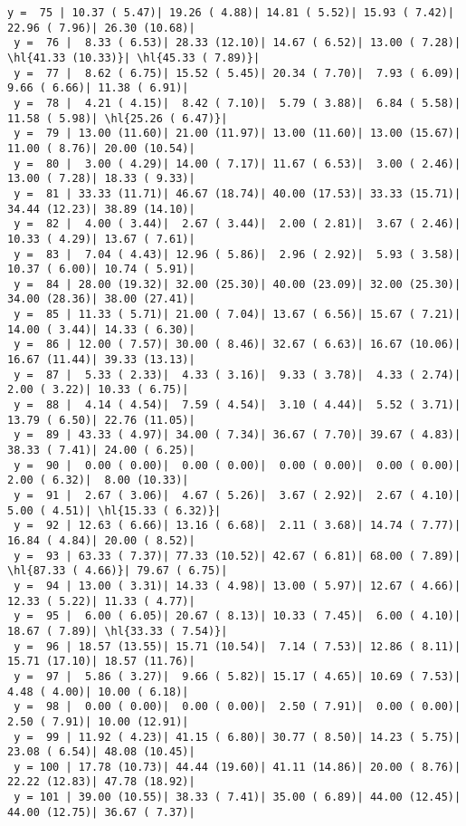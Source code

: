 \documentclass[10pt]{article}
\newcommand{\hl}[1]{\textbf{\textcolor{red}{#1}}}
\begin{document}
\begin{Verbatim}[fontsize=\small, commandchars=\\\{\}]
 y =  75 | 10.37 ( 5.47)| 19.26 ( 4.88)| 14.81 ( 5.52)| 15.93 ( 7.42)| 22.96 ( 7.96)| 26.30 (10.68)|
 y =  76 |  8.33 ( 6.53)| 28.33 (12.10)| 14.67 ( 6.52)| 13.00 ( 7.28)| \hl{41.33 (10.33)}| \hl{45.33 ( 7.89)}|
 y =  77 |  8.62 ( 6.75)| 15.52 ( 5.45)| 20.34 ( 7.70)|  7.93 ( 6.09)|  9.66 ( 6.66)| 11.38 ( 6.91)|
 y =  78 |  4.21 ( 4.15)|  8.42 ( 7.10)|  5.79 ( 3.88)|  6.84 ( 5.58)| 11.58 ( 5.98)| \hl{25.26 ( 6.47)}|
 y =  79 | 13.00 (11.60)| 21.00 (11.97)| 13.00 (11.60)| 13.00 (15.67)| 11.00 ( 8.76)| 20.00 (10.54)|
 y =  80 |  3.00 ( 4.29)| 14.00 ( 7.17)| 11.67 ( 6.53)|  3.00 ( 2.46)| 13.00 ( 7.28)| 18.33 ( 9.33)|
 y =  81 | 33.33 (11.71)| 46.67 (18.74)| 40.00 (17.53)| 33.33 (15.71)| 34.44 (12.23)| 38.89 (14.10)|
 y =  82 |  4.00 ( 3.44)|  2.67 ( 3.44)|  2.00 ( 2.81)|  3.67 ( 2.46)| 10.33 ( 4.29)| 13.67 ( 7.61)|
 y =  83 |  7.04 ( 4.43)| 12.96 ( 5.86)|  2.96 ( 2.92)|  5.93 ( 3.58)| 10.37 ( 6.00)| 10.74 ( 5.91)|
 y =  84 | 28.00 (19.32)| 32.00 (25.30)| 40.00 (23.09)| 32.00 (25.30)| 34.00 (28.36)| 38.00 (27.41)|
 y =  85 | 11.33 ( 5.71)| 21.00 ( 7.04)| 13.67 ( 6.56)| 15.67 ( 7.21)| 14.00 ( 3.44)| 14.33 ( 6.30)|
 y =  86 | 12.00 ( 7.57)| 30.00 ( 8.46)| 32.67 ( 6.63)| 16.67 (10.06)| 16.67 (11.44)| 39.33 (13.13)|
 y =  87 |  5.33 ( 2.33)|  4.33 ( 3.16)|  9.33 ( 3.78)|  4.33 ( 2.74)|  2.00 ( 3.22)| 10.33 ( 6.75)|
 y =  88 |  4.14 ( 4.54)|  7.59 ( 4.54)|  3.10 ( 4.44)|  5.52 ( 3.71)| 13.79 ( 6.50)| 22.76 (11.05)|
 y =  89 | 43.33 ( 4.97)| 34.00 ( 7.34)| 36.67 ( 7.70)| 39.67 ( 4.83)| 38.33 ( 7.41)| 24.00 ( 6.25)|
 y =  90 |  0.00 ( 0.00)|  0.00 ( 0.00)|  0.00 ( 0.00)|  0.00 ( 0.00)|  2.00 ( 6.32)|  8.00 (10.33)|
 y =  91 |  2.67 ( 3.06)|  4.67 ( 5.26)|  3.67 ( 2.92)|  2.67 ( 4.10)|  5.00 ( 4.51)| \hl{15.33 ( 6.32)}|
 y =  92 | 12.63 ( 6.66)| 13.16 ( 6.68)|  2.11 ( 3.68)| 14.74 ( 7.77)| 16.84 ( 4.84)| 20.00 ( 8.52)|
 y =  93 | 63.33 ( 7.37)| 77.33 (10.52)| 42.67 ( 6.81)| 68.00 ( 7.89)| \hl{87.33 ( 4.66)}| 79.67 ( 6.75)|
 y =  94 | 13.00 ( 3.31)| 14.33 ( 4.98)| 13.00 ( 5.97)| 12.67 ( 4.66)| 12.33 ( 5.22)| 11.33 ( 4.77)|
 y =  95 |  6.00 ( 6.05)| 20.67 ( 8.13)| 10.33 ( 7.45)|  6.00 ( 4.10)| 18.67 ( 7.89)| \hl{33.33 ( 7.54)}|
 y =  96 | 18.57 (13.55)| 15.71 (10.54)|  7.14 ( 7.53)| 12.86 ( 8.11)| 15.71 (17.10)| 18.57 (11.76)|
 y =  97 |  5.86 ( 3.27)|  9.66 ( 5.82)| 15.17 ( 4.65)| 10.69 ( 7.53)|  4.48 ( 4.00)| 10.00 ( 6.18)|
 y =  98 |  0.00 ( 0.00)|  0.00 ( 0.00)|  2.50 ( 7.91)|  0.00 ( 0.00)|  2.50 ( 7.91)| 10.00 (12.91)|
 y =  99 | 11.92 ( 4.23)| 41.15 ( 6.80)| 30.77 ( 8.50)| 14.23 ( 5.75)| 23.08 ( 6.54)| 48.08 (10.45)|
 y = 100 | 17.78 (10.73)| 44.44 (19.60)| 41.11 (14.86)| 20.00 ( 8.76)| 22.22 (12.83)| 47.78 (18.92)|
 y = 101 | 39.00 (10.55)| 38.33 ( 7.41)| 35.00 ( 6.89)| 44.00 (12.45)| 44.00 (12.75)| 36.67 ( 7.37)|
\end{Verbatim}
\end{document}
